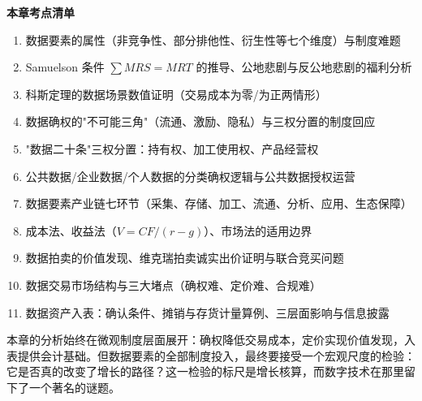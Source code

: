 \begin{chapterbox}
\textbf{本章考点清单}

\begin{enumerate}
\item 数据要素的属性（非竞争性、部分排他性、衍生性等七个维度）与制度难题 
\item Samuelson 条件 $\sum MRS = MRT$ 的推导、公地悲剧与反公地悲剧的福利分析 
\item 科斯定理的数据场景数值证明（交易成本为零/为正两情形）
\item 数据确权的"不可能三角"（流通、激励、隐私）与三权分置的制度回应 
\item "数据二十条"三权分置：持有权、加工使用权、产品经营权 
\item 公共数据/企业数据/个人数据的分类确权逻辑与公共数据授权运营 
\item 数据要素产业链七环节（采集、存储、加工、流通、分析、应用、生态保障）
\item 成本法、收益法（$V = CF/(r-g)$）、市场法的适用边界 
\item 数据拍卖的价值发现、维克瑞拍卖诚实出价证明与联合竞买问题 
\item 数据交易市场结构与三大堵点（确权难、定价难、合规难）
\item 数据资产入表：确认条件、摊销与存货计量算例、三层面影响与信息披露 
\end{enumerate}
\end{chapterbox}

本章的分析始终在微观制度层面展开：确权降低交易成本，定价实现价值发现，入表提供会计基础。但数据要素的全部制度投入，最终要接受一个宏观尺度的检验：它是否真的改变了增长的路径？这一检验的标尺是增长核算，而数字技术在那里留下了一个著名的谜题。
